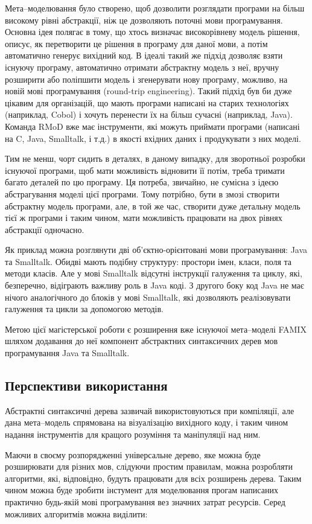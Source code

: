 \documentclass[12pt,a4paper]{article}
\begin{document}
Мета--моделювання було створено, щоб дозволити розглядати програми на більш високому рівні абстракції, ніж це дозволяють поточні мови програмування. Основна ідея полягає в тому, що хтось визначає високорівневу модель рішення, описує, як перетворити це рішення в програму для даної мови, а потім автоматично генерує вихідний код. В ідеалі такий же підхід дозволяє взяти існуючу програму, автоматично отримати абстрактну модель з неї, вручну розширити або поліпшити модель і згенерувати нову програму, можливо, на новій мові програмування (round-trip engineering). Такий підхід був би дуже цікавим для організацій, що мають програми написані на старих технологіях (наприклад, Cobol) і хочуть перенести їх на більш сучасні (наприклад, Java). Команда RMoD вже має інструменти, які можуть приймати програми (написані на C, Java, Smalltalk, і т.д.) в якості вхідних даних і продукувати з них моделі.

Тим не менш, чорт сидить в деталях, в даному випадку, для зворотньої розробки існуючої програми, щоб мати можливість відновити її потім, треба тримати багато деталей по цю програму. Ця потреба, звичайно, не сумісна з ідеєю абстрагування моделі цієї програми. Тому потрібно, бути в змозі створити абстрактну модель програми, але, в той же час, створити дуже детальну модель тієї ж програми і таким чином, мати можливість працювати на двох рівнях абстракції одночасно.

Як приклад можна розглянути дві об'єктно-орієнтовані мови програмування: Java та Smalltalk. Обидві мають подібну структуру: простори імен, класи, поля та методи класів. Але у мові Smalltalk відсутні інструкції галуження та циклу, які, безперечно, відіграють важливу роль в Java коді. З другого боку код Java не має нічого аналогічного до блоків у мові Smalltalk, які дозволяють реалізовувати галуження та цикли за допомогою методів.

Метою цієї магістерської роботи є розширення вже існуючої мета--моделі FAMIX шляхом додавання до неї компонент абстрактних синтаксичних дерев мов програмування Java та Smalltalk.

\subsection{Перспективи використання}
Абстрактні синтаксичні дерева зазвичай використовуються при компіляції, але дана мета--модель спрямована на візуалізацію вихідного коду, і таким чином надання інструментів для кращого розуміння та маніпуляції над ним.

Маючи в своєму розпорядженні універсальне дерево, яке можна буде розширювати для різних мов, слідуючи простим правилам, можна розробляти алгоритми, які, відповідно, будуть працювати для всіх розширень дерева. Таким чином можна буде зробити інстумент для моделювання прогам написаних практично будь-якій мові програмування вез значних затрат ресурсів. Серед можливих алгоритмів можна виділити:
\end{document}
